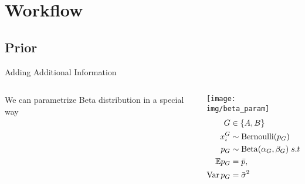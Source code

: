 \documentclass{beamer}
\begin{document}
\section{Workflow}
\subsection{Prior}
\begin{frame}{Adding Additional Information}
    \begin{columns}
    \begin{column}{0.5\linewidth}
    We can parametrize Beta distribution in a special way
    \end{column}
    \begin{column}{0.5\linewidth}
    \texttt{[image: img/beta\_param]}
    \begin{align*}
        G &\in \{A, B\}\\
        x^G_i & \sim \operatorname{Bernoulli}(p_G)\\
        p_G &\sim \operatorname{Beta}(\alpha_G, \beta_G)\;s.t. \\
        \mathbb{E} p_G &= \bar p, \\
        \operatorname{Var} p_G &= \bar \sigma^2
    \end{align*}
    \end{column}
    \end{columns}
\end{frame}
\end{document}
